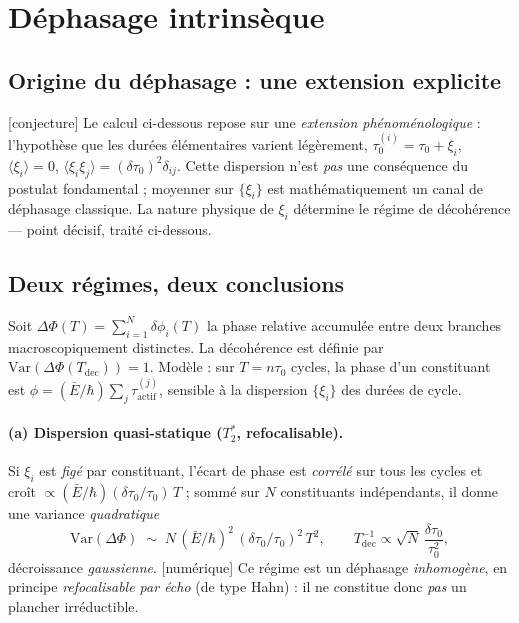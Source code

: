 \documentclass[11pt,a4paper]{article}
\newcommand{\statut}[1]{{\footnotesize\textsf{[#1]}}}
\theoremstyle{plain}
\theoremstyle{definition}
\theoremstyle{remark}
\begin{document}
\section{D\'ephasage intrins\`eque}\label{sec:deco}
\subsection{Origine du d\'ephasage : une extension explicite}\label{sec:disp}
\statut{conjecture} Le calcul ci-dessous repose sur une \emph{extension
ph\'enom\'enologique} : l'hypoth\`ese que les dur\'ees \'el\'ementaires varient l\'eg\`erement,
$\tau_0^{(i)}=\tau_0+\xi_i$, $\langle\xi_i\rangle=0$,
$\langle\xi_i\xi_j\rangle=(\delta\tau_0)^2\delta_{ij}$. Cette dispersion n'est
\emph{pas} une cons\'equence du postulat fondamental ; moyenner sur $\{\xi_i\}$ est
math\'ematiquement un canal de d\'ephasage classique. La nature physique de $\xi_i$
d\'etermine le r\'egime de d\'ecoh\'erence --- point d\'ecisif, trait\'e ci-dessous.

\subsection{Deux r\'egimes, deux conclusions}
Soit $\Delta\Phi(T)=\sum_{i=1}^{N}\delta\phi_i(T)$ la phase relative accumul\'ee entre
deux branches macroscopiquement distinctes. La d\'ecoh\'erence est d\'efinie par
$\mathrm{Var}(\Delta\Phi(T_{\mathrm{dec}}))=1$. Mod\`ele : sur $T=n\tau_0$ cycles, la phase d'un constituant est $\phi=(\bar E/\hbar)\sum_j\tau_{\mathrm{actif}}^{(j)}$, sensible \`a la dispersion $\{\xi_i\}$ des dur\'ees de cycle.

\paragraph{(a) Dispersion quasi-statique ($T_2^\ast$, refocalisable).} Si $\xi_i$ est
\emph{fig\'e} par constituant, l'\'ecart de phase est \emph{corr\'el\'e} sur tous les cycles et cro\^it $\propto(\bar E/\hbar)(\delta\tau_0/\tau_0)\,T$ ; somm\'e sur $N$ constituants ind\'ependants, il donne une variance \emph{quadratique}
\[
\mathrm{Var}(\Delta\Phi)\;\sim\; N\,(\bar E/\hbar)^2\,(\delta\tau_0/\tau_0)^2\,T^2,
\qquad
T_{\mathrm{dec}}^{-1}\propto \sqrt{N}\,\frac{\delta\tau_0}{\tau_0^2},
\]
d\'ecroissance \emph{gaussienne}. \statut{num\'erique} Ce r\'egime est un d\'ephasage
\emph{inhomog\`ene}, en principe \emph{refocalisable par \'echo} (de type Hahn) : il
ne constitue donc \emph{pas} un plancher irr\'eductible.
\end{document}
